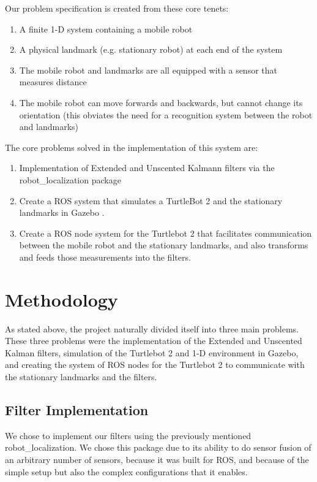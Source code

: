 \documentclass[conference]{IEEEtran}
\begin{document}
Our problem specification is created from these core tenets:
\begin{enumerate}
\item A finite 1-D system containing a mobile robot
\item A physical landmark (e.g. stationary robot) at each end of the system
\item The mobile robot and landmarks are all equipped with a sensor that measures distance
\item The mobile robot can move forwards and backwards, but cannot change its orientation (this obviates the need for a
recognition system between the robot and landmarks)
\end{enumerate}

The core problems solved in the implementation of this system are:
\begin{enumerate}
\item Implementation of Extended and Unscented Kalmann filters via the robot\_localization package
\cite{robot_localization}
\item Create a ROS \cite{ros_original} system that simulates a TurtleBot 2 and the stationary landmarks in Gazebo
\cite{gazebo}.
\item Create a ROS node system for the Turtlebot 2 that facilitates communication between the mobile robot and the 
stationary landmarks, and also transforms and feeds those measurements into the filters.
\end{enumerate}


\section{Methodology}
As stated above, the project naturally divided itself into three main problems. These three problems were the
implementation of the Extended and Unscented Kalman filters, simulation of the Turtlebot 2 and 1-D environment in 
Gazebo, and creating the system of ROS nodes for the Turtlebot 2 to communicate with the stationary landmarks and the 
filters.

\subsection{Filter Implementation}
We chose to implement our filters using the previously mentioned robot\_localization. We chose this package due to its 
ability to do sensor fusion of an arbitrary number of sensors, because it was built for ROS, and because of the simple 
setup but also the complex configurations that it enables.
\end{document}
